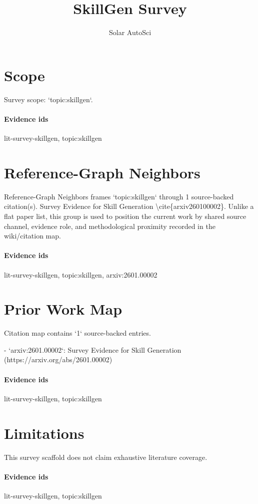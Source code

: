 \documentclass{article}
\title{SkillGen Survey}
\author{Solar AutoSci}
\date{}
\begin{document}
\maketitle

\section{Scope}
Survey scope: `topic:skillgen`.

\paragraph{Evidence ids} lit-survey-skillgen, topic:skillgen

\section{Reference-Graph Neighbors}
Reference-Graph Neighbors frames `topic:skillgen` through 1 source-backed citation(s). Survey Evidence for Skill Generation \textbackslash{}cite\{arxiv260100002\}. Unlike a flat paper list, this group is used to position the current work by shared source channel, evidence role, and methodological proximity recorded in the wiki/citation map.

\paragraph{Evidence ids} lit-survey-skillgen, topic:skillgen, arxiv:2601.00002

\section{Prior Work Map}
Citation map contains `1` source-backed entries.

- `arxiv:2601.00002`: Survey Evidence for Skill Generation (https://arxiv.org/abs/2601.00002)

\paragraph{Evidence ids} lit-survey-skillgen, topic:skillgen

\section{Limitations}
This survey scaffold does not claim exhaustive literature coverage.

\paragraph{Evidence ids} lit-survey-skillgen, topic:skillgen
\end{document}
